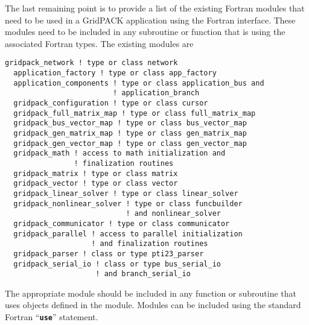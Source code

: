 The last remaining point is to provide a list of the existing Fortran modules that need to be used in a GridPACK application using the Fortran interface. These modules need to be included in any subroutine or function that is using the associated Fortran types. The existing modules are

{
\color{red}
\begin{Verbatim}[fontseries=b]
  gridpack_network ! type or class network
  application_factory ! type or class app_factory
  application_components ! type or class application_bus and
                         ! application_branch
  gridpack_configuration ! type or class cursor
  gridpack_full_matrix_map ! type or class full_matrix_map
  gridpack_bus_vector_map ! type or class bus_vector_map
  gridpack_gen_matrix_map ! type or class gen_matrix_map
  gridpack_gen_vector_map ! type or class gen_vector_map
  gridpack_math ! access to math initialization and
                ! finalization routines
  gridpack_matrix ! type or class matrix
  gridpack_vector ! type or class vector
  gridpack_linear_solver ! type or class linear_solver
  gridpack_nonlinear_solver ! type or class funcbuilder
                            ! and nonlinear_solver
  gridpack_communicator ! type or class communicator
  gridpack_parallel ! access to parallel initialization
                    ! and finalization routines
  gridpack_parser ! class or type pti23_parser
  gridpack_serial_io ! class or type bus_serial_io
                     ! and branch_serial_io
\end{Verbatim}
}

The appropriate module should be included in any function or subroutine that uses objects defined in the module. Modules can be included using the standard Fortran ``\texttt{\textbf{use}}'' statement.
